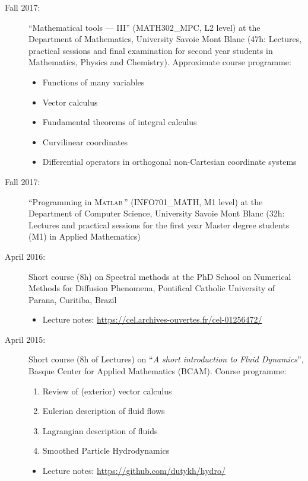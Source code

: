 \documentclass[final, a4paper, oneside, 12pt]{article}
\numberwithin{equation}{section}
\begin{document}
\begin{description}
  \item[Fall 2017:] ``Mathematical tools --- III'' (MATH302\_MPC, L2 level) at the Department of Mathematics, University Savoie Mont Blanc (47h: Lectures, practical sessions and final examination for second year students in Mathematics, Physics and Chemistry). Approximate course programme:
  \begin{itemize}
    \item Functions of many variables
    \item Vector calculus
    \item Fundamental theorems of integral calculus
    \item Curvilinear coordinates
    \item Differential operators in orthogonal non-Cartesian coordinate systems
  \end{itemize}
  
  \item[Fall 2017:] ``Programming in \textsc{Matlab}\texttrademark\,'' (INFO701\_MATH, M1 level) at the Department of Computer Science, University Savoie Mont Blanc (32h: Lectures and practical sessions for the first year Master degree students (M1) in Applied Mathematics)

  \item[April 2016:] Short course (8h) on Spectral methods at the PhD School on Numerical Methods for Diffusion Phenomena, Pontifical Catholic University of Parana, Curitiba, Brazil
  \begin{itemize}
    \item Lecture notes: \url{https://cel.archives-ouvertes.fr/cel-01256472/}
  \end{itemize}

  \item[April 2015:] Short course (8h of Lectures) on ``\textit{A short introduction to Fluid Dynamics}'', Basque Center for Applied Mathematics (BCAM). Course programme:
  \begin{enumerate}
    \item Review of (exterior) vector calculus
    \item Eulerian description of fluid flows
    \item Lagrangian description of fluids
    \item Smoothed Particle Hydrodynamics
  \end{enumerate}
  \begin{itemize}
    \item Lecture notes: \url{https://github.com/dutykh/hydro/}
  \end{itemize}


\end{description}
\end{document}
